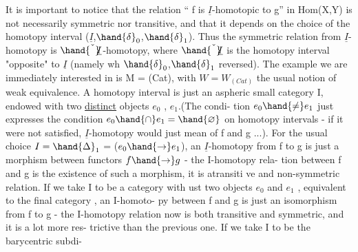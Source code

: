 It is important to notice that the  relation `` f is $\underline{I}$-homotopic
to g'' in Hom(X,Y) is not necessarily symmetric nor transitive,  and that
it depends on the choice of the homotopy interval ($\underline{I}$,$\hand{\delta}_0$,$\hand{\delta}_1$).  Thus the
symmetric relation from  $\underline{I}$-homotopy is $\hand{\check{\phantom{I}}}\!\!\underline{I}$-homotopy,  where  $\hand{\check{\phantom{I}}}\!\!\underline{I}$ is the
homotopy interval "opposite" to $\underline{I}$  (namely wh $\hand{\delta}_0$,$\hand{\delta}_1$ reversed).  The
example we are immediately interested in is  M = (Cat),  with $W=W_{(Cat)}$ the
usual notion of weak equivalence.  A homotopy interval is just an aspheric
small category I,  endowed with two \uline{distinct} objects  $e_0$ , $e_1$.(The condi-%
tion $e_0\hand{\neq}e_1$  just expresses the condition  $e_0\hand{\cap} e_1 = \hand{\varnothing}$  on homotopy intervals
-  if it were not satisfied,  $\underline{I}$-homotopy would just mean   of f and
g ...).  For the usual choice  $I =\hand{\Delta}_1$ =  ($e_0\hand{\rightarrow} e_1$),  an $\underline{I}$-homotopy from
f to g is just a  morphism  between functors $f\hand{\rightarrow} g$  -  the I-homotopy rela-%
tion between f and g is the existence of such a morphism,  it is a\hand{\ensuremath{\backslash}}transiti%
ve\hand{,} and  non-symmetric relation.  If we take I to be a category with ust
two objects $e_0$ and $e_1$  ,  equivalent to the final category ,  an I-homoto-%
py between f and g is  just an isomorphism from f to g  -  the I-homotopy
relation now is both transitive and symmetric,  and it is a lot more res-%
trictive than the previous one.  If we take I to be the barycentric subdi-%

